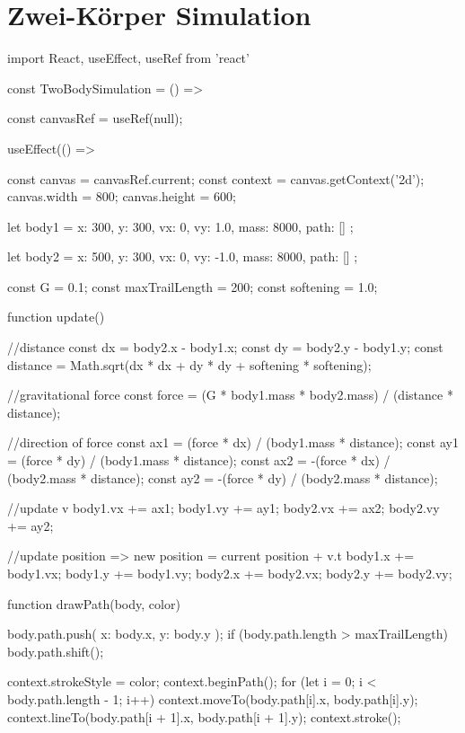 \documentclass[a4paper,12pt,twoside]{article}
\begin{document}
\section{Zwei-Körper Simulation}
\begin{javascript}
import React, { useEffect, useRef } from 'react'

const TwoBodySimulation = () => {

    const canvasRef = useRef(null);

    useEffect(() => {

        const canvas = canvasRef.current;
        const context = canvas.getContext('2d');
        canvas.width = 800;
        canvas.height = 600;

        let body1 = { x: 300, y: 300, vx: 0, vy: 1.0, mass: 8000, path: [] };

        let body2 = { x: 500, y: 300, vx: 0, vy: -1.0, mass: 8000, path: [] };

        const G = 0.1;
        const maxTrailLength = 200;
        const softening = 1.0;

        function update() {

            //distance
            const dx = body2.x - body1.x;
            const dy = body2.y - body1.y;
            const distance = Math.sqrt(dx * dx + dy * dy + softening * softening);

            //gravitational force
            const force = (G * body1.mass * body2.mass) / (distance * distance);

            //direction of force
            const ax1 = (force * dx) / (body1.mass * distance);
            const ay1 = (force * dy) / (body1.mass * distance);
            const ax2 = -(force * dx) / (body2.mass * distance);
            const ay2 = -(force * dy) / (body2.mass * distance);

            //update v 
            body1.vx += ax1;
            body1.vy += ay1;
            body2.vx += ax2;
            body2.vy += ay2;

            //update position => new position = current position + v.t
            body1.x += body1.vx;
            body1.y += body1.vy;
            body2.x += body2.vx;
            body2.y += body2.vy;
        }

        function drawPath(body, color) {
            body.path.push({ x: body.x, y: body.y });
            if (body.path.length > maxTrailLength) body.path.shift();

            context.strokeStyle = color;
            context.beginPath();
            for (let i = 0; i < body.path.length - 1; i++) {
                context.moveTo(body.path[i].x, body.path[i].y);
                context.lineTo(body.path[i + 1].x, body.path[i + 1].y);
            }
            context.stroke();
        }

}}
\end{javascript}
\end{document}
